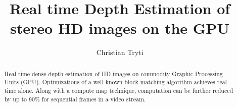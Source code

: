 \documentclass[twoside,openright,a4paper,12pt]{report}
\title{Real time Depth Estimation of stereo HD images on the GPU}
\author{Christian Tryti}
\date{} %
\begin{document}
\uiosloforside[kind=Master's Thesis]


\maketitle

\clearpage
{}

\begin{abstract}
  Real time dense depth estimation of HD images on commodity Graphic
  Processing Units (GPU). Optimizations of a well known block matching
  algorithm achieves real time alone. Along with a compute map
  technique, computation can be further reduced by up to 90\% for
  sequential frames in a video stream.
\end{abstract}

\tableofcontents{}
\listoffigures{}
\listoftables{}


\clearpage{}








\appendix







\end{document}
